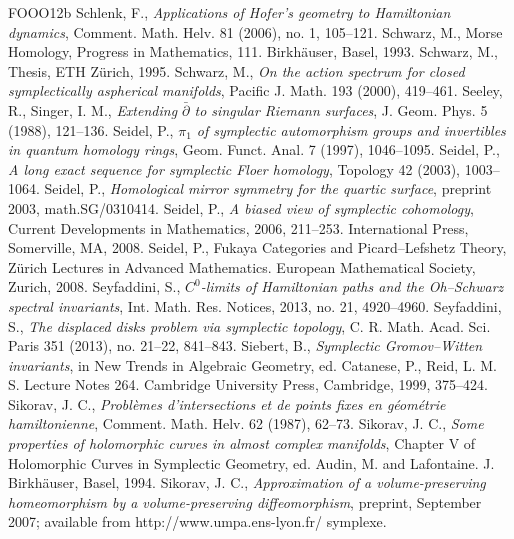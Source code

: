 \begin{thebibliography}{FOOO12b}
 Schlenk, F., \textit{Applications of Hofer\textquoteright{}s geometry to Hamiltonian dynamics}, Comment. Math. Helv. 81 (2006), no. 1, 105--121.
 Schwarz, M., Morse Homology, Progress in Mathematics, 111. Birkhäuser, Basel, 1993.
 Schwarz, M., Thesis, ETH Zürich, 1995.
 Schwarz, M., \textit{On the action spectrum for closed symplectically aspherical manifolds}, Pacific J. Math. 193 (2000), 419--461.
 Seeley, R., Singer, I. M., \textit{Extending $\bar\partial$ to singular Riemann surfaces}, J. Geom. Phys. 5 (1988), 121--136.
 Seidel, P., \textit{$\pi_1$ of symplectic automorphism groups and invertibles in quantum homology rings}, Geom. Funct. Anal. 7 (1997), 1046--1095.
 Seidel, P., \textit{A long exact sequence for symplectic Floer homology}, Topology 42 (2003), 1003--1064.
 Seidel, P., \textit{Homological mirror symmetry for the quartic surface}, preprint 2003, math.SG/0310414.
 Seidel, P., \textit{A biased view of symplectic cohomology}, Current Developments in Mathematics, 2006, 211--253. International Press, Somerville, MA, 2008.
 Seidel, P., Fukaya Categories and Picard--Lefshetz Theory, Zürich Lectures in Advanced Mathematics. European Mathematical Society, Zurich, 2008.
 Seyfaddini, S., \textit{$C^0$-limits of Hamiltonian paths and the Oh--Schwarz spectral invariants}, Int. Math. Res. Notices, 2013, no. 21, 4920--4960.
 Seyfaddini, S., \textit{The displaced disks problem via symplectic topology}, C. R. Math. Acad. Sci. Paris 351 (2013), no. 21--22, 841--843.
 Siebert, B., \textit{Symplectic Gromov--Witten invariants}, in New Trends in Algebraic Geometry, ed. Catanese, P., Reid, L. M. S. Lecture Notes 264. Cambridge University Press, Cambridge, 1999, 375--424.
 Sikorav, J. C., \textit{Problèmes d\textquoteright{}intersections et de points fixes en géométrie hamiltonienne}, Comment. Math. Helv. 62 (1987), 62--73.
 Sikorav, J. C., \textit{Some properties of holomorphic curves in almost complex manifolds}, Chapter V of Holomorphic Curves in Symplectic Geometry, ed. Audin, M. and Lafontaine. J. Birkhäuser, Basel, 1994.
 Sikorav, J. C., \textit{Approximation of a volume-preserving homeomorphism by a volume-preserving diffeomorphism}, preprint, September 2007; available from http://www.umpa.ens-lyon.fr/ symplexe.

\end{thebibliography}

